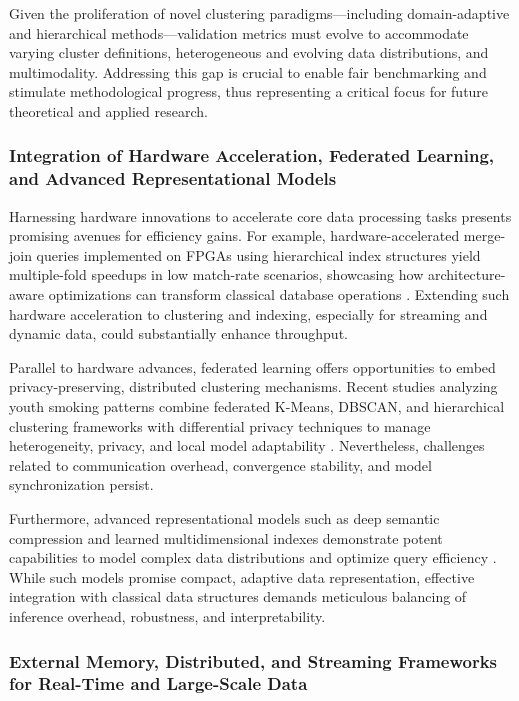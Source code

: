 \documentclass[sigconf]{acmart}
\begin{document}
Given the proliferation of novel clustering paradigms—including domain-adaptive and hierarchical methods—validation metrics must evolve to accommodate varying cluster definitions, heterogeneous and evolving data distributions, and multimodality. Addressing this gap is crucial to enable fair benchmarking and stimulate methodological progress, thus representing a critical focus for future theoretical and applied research.

\subsubsection{Integration of Hardware Acceleration, Federated Learning, and Advanced Representational Models}

Harnessing hardware innovations to accelerate core data processing tasks presents promising avenues for efficiency gains. For example, hardware-accelerated merge-join queries implemented on FPGAs using hierarchical index structures yield multiple-fold speedups in low match-rate scenarios, showcasing how architecture-aware optimizations can transform classical database operations \cite{ref27}. Extending such hardware acceleration to clustering and indexing, especially for streaming and dynamic data, could substantially enhance throughput.

Parallel to hardware advances, federated learning offers opportunities to embed privacy-preserving, distributed clustering mechanisms. Recent studies analyzing youth smoking patterns combine federated K-Means, DBSCAN, and hierarchical clustering frameworks with differential privacy techniques to manage heterogeneity, privacy, and local model adaptability \cite{ref25}. Nevertheless, challenges related to communication overhead, convergence stability, and model synchronization persist.

Furthermore, advanced representational models such as deep semantic compression and learned multidimensional indexes demonstrate potent capabilities to model complex data distributions and optimize query efficiency \cite{ref16,ref33}. While such models promise compact, adaptive data representation, effective integration with classical data structures demands meticulous balancing of inference overhead, robustness, and interpretability.

\subsubsection{External Memory, Distributed, and Streaming Frameworks for Real-Time and Large-Scale Data}
\end{document}
